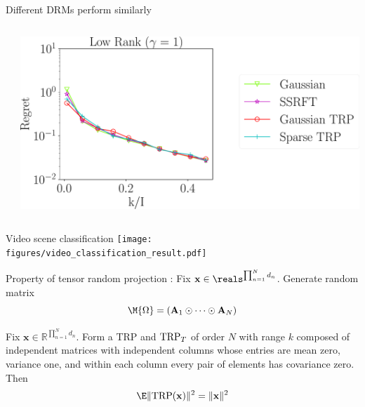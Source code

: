\documentclass[handout,xcolor={usenames,dvipsnames}]{beamer}
\begin{document}
\begin{frame}{Different DRMs perform similarly}
\begin{columns}
\begin{column}{0.3\textwidth}
	\end{column}
	\begin{column}{0.6\textwidth}
		\includegraphics[scale = 0.25]{fig2_lk_hnoise_600.pdf}
	\end{column}
\end{columns}


\end{frame}

\begin{frame}{Video scene classification}
\texttt{[image: \\figures/video\_classification\_result.pdf]} \\

\end{frame}


\begin{frame}{Property of tensor random projection}
:
Fix $\mathbf{x} \in \reals^{\prod_{n=1}^N d_n}$. Generate random matrix 
\[
\M{\Omega}= (\mathbf{A}_1 \odot \cdots \odot \mathbf{A}_N)
\]
\begin{thm}
	Fix $\mathbf{x} \in \mathbb{R}^{\prod_{n=1}^N d_n}$.
	Form a TRP and $\textup{TRP}_T$ of order $N$ with range $k$
	composed of independent matrices with independent columns
	whose entries are mean zero, variance one, and within each column every pair of elements has covariance zero.
	Then
\begin{equation}
\E \|\textup{TRP}(\mathbf{x})\|^2 = \|\mathbf{x}\|^2 
\end{equation}
\end{thm}



\end{frame}
\end{document}
